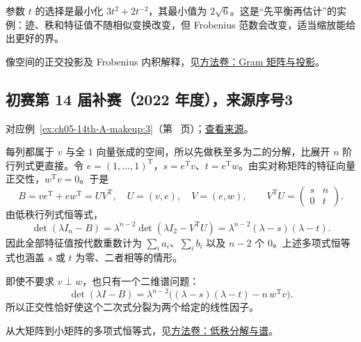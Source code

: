 \documentclass[12pt,fontset=fandol]{ctexart}
\begin{document}
\begin{remark}[方法与条件]

参数 $t$ 的选择是最小化 $3t^2+2t^{-2}$，其最小值为 $2\sqrt6$。这是“先平衡再估计”的实例：迹、秩和特征值不随相似变换改变，但 Frobenius 范数会改变，适当缩放能给出更好的界。

像空间的正交投影及 Frobenius 内积解释，见\hyperref[app:linear-gram]{方法卷：Gram 矩阵与投影}。

\end{remark}

\subsection{初赛第 14 届补赛（2022 年度），来源序号3}\label{ans:ch05-14th-A-makeup:3}\label{pr:ch05-14th-A-makeup:3}

对应例~\ref{ex:ch05-14th-A-makeup:3}（第~\pageref{ex:ch05-14th-A-makeup:3} 页）；\href{https://github.com/lzxcr/cmc-mathematics/blob/64916fa1fdbc3e444a652eca204d5669058ee321/src/problems/preliminary/14-makeup/03.md}{查看来源}。

\begin{solve}

每列都属于 $v$ 与全 $1$ 向量张成的空间，所以先做秩至多为二的分解，比展开 $n$ 阶行列式更直接。令 $e=(1,\ldots,1)^{\mathrm T}$，$s=e^{\mathrm T}v$、$t=e^{\mathrm T}w$。由实对称矩阵的特征向量正交性，$w^{\mathrm T}v=0$。于是
\[
B=ve^{\mathrm T}+ew^{\mathrm T}=UV^{\mathrm T},
\quad U=(v,e),\quad V=(e,w),
\qquad
V^{\mathrm T}U=\begin{pmatrix}s&n\\0&t\end{pmatrix}.
\]
由低秩行列式恒等式，
\[
\det(\lambda I_n-B)
=\lambda^{n-2}\det(\lambda I_2-V^{\mathrm T}U)
=\lambda^{n-2}(\lambda-s)(\lambda-t).
\]
因此全部特征值按代数重数计为 $\sum_i a_i$、$\sum_i b_i$ 以及 $n-2$ 个 $0$。上述多项式恒等式也涵盖 $s$ 或 $t$ 为零、二者相等的情形。

\end{solve}

\begin{remark}[方法与条件]

即使不要求 $v\perp w$，也只有一个二维谱问题：
\[
\det(\lambda I-B)=\lambda^{n-2}
\bigl((\lambda-s)(\lambda-t)-n\,w^{\mathrm T}v\bigr).
\]
所以正交性恰好使这个二次式分裂为两个给定的线性因子。

从大矩阵到小矩阵的多项式恒等式，见\hyperref[app:linear-lowrank]{方法卷：低秩分解与谱}。

\end{remark}
\end{document}
